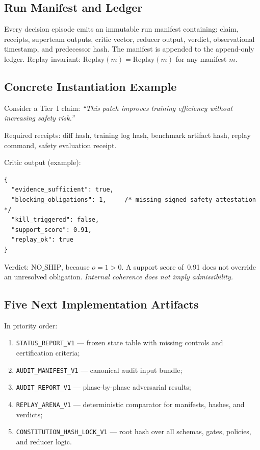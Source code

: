 \documentclass[11pt,a4paper]{article}
\theoremstyle{plain}
\theoremstyle{definition}
\theoremstyle{remark}
\begin{document}
\subsection{Run Manifest and Ledger}

Every decision episode emits an immutable run manifest containing:
claim, receipts, superteam outputs, critic vector, reducer output,
verdict, observational timestamp, and predecessor hash.
The manifest is appended to the append-only ledger.
Replay invariant: $\mathrm{Replay}(m) = \mathrm{Replay}(m)$ for any manifest $m$.

\subsection{Concrete Instantiation Example}

Consider a Tier~I claim:
\emph{``This patch improves training efficiency without increasing safety risk.''}

Required receipts: diff hash, training log hash, benchmark artifact hash,
replay command, safety evaluation receipt.

Critic output (example):
\begin{lstlisting}
{
  "evidence_sufficient": true,
  "blocking_obligations": 1,     /* missing signed safety attestation */
  "kill_triggered": false,
  "support_score": 0.91,
  "replay_ok": true
}
\end{lstlisting}

Verdict: $\mathrm{NO\_SHIP}$, because $o = 1 > 0$.
A support score of~0.91 does not override an unresolved obligation.
\emph{Internal coherence does not imply admissibility.}

\subsection{Five Next Implementation Artifacts}

In priority order:
\begin{enumerate}[nosep]
  \item \texttt{STATUS\_REPORT\_V1} — frozen state table with missing controls
        and certification criteria;
  \item \texttt{AUDIT\_MANIFEST\_V1} — canonical audit input bundle;
  \item \texttt{AUDIT\_REPORT\_V1} — phase-by-phase adversarial results;
  \item \texttt{REPLAY\_ARENA\_V1} — deterministic comparator for manifests,
        hashes, and verdicts;
  \item \texttt{CONSTITUTION\_HASH\_LOCK\_V1} — root hash over all schemas,
        gates, policies, and reducer logic.
\end{enumerate}
\end{document}
